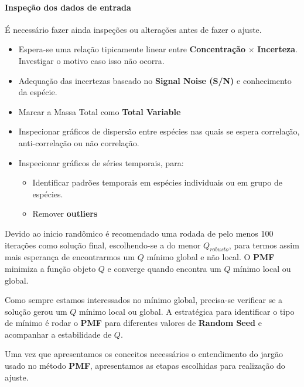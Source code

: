 \paragraph{Inspeção dos dados de entrada}

É necessário fazer ainda inspeções ou alterações antes de fazer o ajuste.
\begin{itemize}
  \item Espera-se uma relação tipicamente linear entre 
        \textbf{Concentração} $\times$ \textbf{Incerteza}.  
        Investigar o motivo caso isso não ocorra. 
  \item Adequação das incertezas baseado no \textbf{Signal Noise (S/N)} e 
        conhecimento da espécie. 
  \item Marcar a Massa Total como \textbf{Total Variable}
  \item Inspecionar gráficos de dispersão entre espécies nas quais se espera 
        correlação, anti-correlação ou não correlação. 
  \item Inspecionar gráficos de séries temporais, para:
    \begin{itemize}
      \item Identificar padrões temporais em espécies individuais ou em grupo 
            de espécies.
      \item Remover \textbf{outliers} 
    \end{itemize}
\end{itemize}

Devido ao inicio randômico é recomendado uma rodada de pelo menos 100 iterações 
como solução final, escolhendo-se a do menor $Q_{robusto}$, para termos assim 
mais esperança de encontrarmos um $Q$ mínimo global e não local. 
O \textbf{PMF} minimiza a função objeto $Q$ e converge quando encontra um $Q$ 
mínimo local ou global.%

Como sempre estamos interessados no mínimo global, precisa-se verificar se a 
solução gerou um $Q$ mínimo local ou global. A estratégica para identificar
o tipo de mínimo é rodar o \textbf{PMF} para diferentes valores de 
\textbf{Random Seed} e acompanhar a estabilidade de $Q$.

Uma vez que apresentamos os conceitos necessários o entendimento do jargão 
usado no método \textbf{PMF}, apresentamos as etapas escolhidas para realização 
do ajuste.

